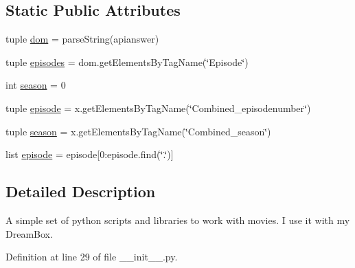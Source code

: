 \subsection*{Static Public Attributes}
\begin{DoxyCompactItemize}
\item 
tuple \hyperlink{classmovies2hdd_1_1_movies2_h_d_d_a23cc104177423d3145c753fb423fbf7f}{dom} = parse\-String(apianswer)
\item 
tuple \hyperlink{classmovies2hdd_1_1_movies2_h_d_d_adebd8de5fde82e9d8b512a03892442d1}{episodes} = dom.\-get\-Elements\-By\-Tag\-Name(\char`\"{}Episode\char`\"{})
\item 
int \hyperlink{classmovies2hdd_1_1_movies2_h_d_d_a948397c62c191d15a109f9867b1a83ec}{season} = 0
\item 
tuple \hyperlink{classmovies2hdd_1_1_movies2_h_d_d_af69365988574fd1f1f66bfd372bd526c}{episode} = x.\-get\-Elements\-By\-Tag\-Name(\char`\"{}Combined\-\_\-episodenumber\char`\"{})
\item 
tuple \hyperlink{classmovies2hdd_1_1_movies2_h_d_d_a60b03ffa3e3f0b0afbaea6b3a3351dc1}{season} = x.\-get\-Elements\-By\-Tag\-Name(\char`\"{}Combined\-\_\-season\char`\"{})
\item 
list \hyperlink{classmovies2hdd_1_1_movies2_h_d_d_ae6cedc0a37fc3d9c391cc0f6bcf872da}{episode} = episode\mbox{[}0\-:episode.\-find(\char`\"{}.\char`\"{})\mbox{]}
\end{DoxyCompactItemize}


\subsection{Detailed Description}
\begin{DoxyVerb}A simple set of python scripts and libraries to work with movies. I use it with my DreamBox.\end{DoxyVerb}
 

Definition at line 29 of file \-\_\-\-\_\-init\-\_\-\-\_\-.\-py.



